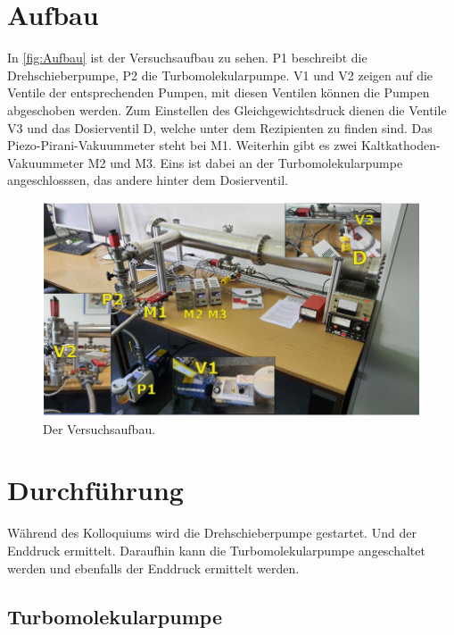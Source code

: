     \section{Aufbau}
        In \autoref{fig:Aufbau} ist der Versuchsaufbau zu sehen.
        P1 beschreibt die Drehschieberpumpe, P2 die Turbomolekularpumpe.
        V1 und V2 zeigen auf die Ventile der entsprechenden Pumpen, mit diesen Ventilen können die Pumpen abgeschoben werden.
        Zum Einstellen des Gleichgewichtsdruck dienen die Ventile V3 und das Dosierventil D, welche unter dem Rezipienten zu finden sind.
        Das Piezo-Pirani-Vakuummeter steht bei M1.
        Weiterhin gibt es zwei Kaltkathoden-Vakuummeter M2 und M3.
        Eins ist dabei an der Turbomolekularpumpe angeschlosssen, das andere hinter dem Dosierventil.

        \begin{figure}[H]
            \centering
            \includegraphics[width=\textwidth]{bilder/Aufbau.png}
            \caption{Der Versuchsaufbau.\cite{anleitung}}
            \label{fig:Aufbau}
        \end{figure}

    \section{Durchführung}
    \label{sec:Durchführung}
        Während des Kolloquiums wird die Drehschieberpumpe gestartet. Und der Enddruck ermittelt.
        Daraufhin kann die Turbomolekularpumpe angeschaltet werden und ebenfalls der Enddruck ermittelt werden. 

        \subsection{Turbomolekularpumpe}
